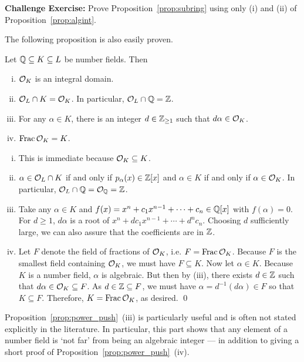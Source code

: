 \noindent \textbf{Challenge Exercise:} Prove Proposition~\ref{prop:subring} using only (i) and (ii) of Proposition~\ref{prop:algint}. \pskip


The following proposition is also easily proven. 


\begin{prop} \label{prop:power_push} 
Let $\mathbb{Q} \subseteq K \subseteq L$ be number fields. Then
\begin{enumerate}[(i)]
\item $\mathcal{O}_K$ is an integral domain.
\item $\mathcal{O}_L \cap K= \mathcal{O}_K$. In particular, $\mathcal{O}_L \cap \mathbb{Q}= \mathbb{Z}$.
\item For any $\alpha \in K$, there is an integer $d \in \mathbb{Z}_{\geq 1}$ such that $d \alpha \in \mathcal{O}_K$.
\item $\operatorname{Frac} \mathcal{O}_K= K$.
\end{enumerate}
\end{prop}

\pf \hfill
\begin{enumerate}[(i)]
\item This is immediate because $\mathcal{O}_K \subseteq K$.

\item $\alpha \in \mathcal{O}_L \cap K$ if and only if $p_\alpha(x) \in \mathbb{Z}[x]$ and $\alpha \in K$ if and only if $\alpha \in \mathcal{O}_K$. In particular, $\mathcal{O}_L \cap \mathbb{Q}= \mathcal{O}_{\mathbb{Q}}= \mathbb{Z}$.

\item Take any $\alpha \in K$ and $f(x)= x^n + c_1 x^{n-1} + \cdots + c_n \in \mathbb{Q}[x]$ with $f(\alpha)= 0$. For $d \geq 1$, $d \alpha$ is a root of $x^n + d c_1 x^{n-1} + \cdots + d^n c_n$. Choosing $d$ sufficiently large, we can also assure that the coefficients are in $\mathbb{Z}$. 

\item Let $F$ denote the field of fractions of $\mathcal{O}_K$, i.e. $F= \operatorname{Frac} \mathcal{O}_K$. Because $F$ is the smallest field containing $\mathcal{O}_K$, we must have $F \subseteq K$. Now let $\alpha \in K$. Because $K$ is a number field, $\alpha$ is algebraic. But then by (iii), there exists $d \in \mathbb{Z}$ such that $d \alpha \in \mathcal{O}_K \subseteq F$. As $d \in \mathbb{Z} \subseteq F$, we must have $\alpha= d^{-1}(d\alpha) \in F$ so that $K \subseteq F$. Therefore, $K= \operatorname{Frac} \mathcal{O}_K$, as desired. \qed \pskip
\end{enumerate}


Proposition~\ref{prop:power_push}~(iii) is particularly useful and is often not stated explicitly in the literature. In particular, this part shows that any element of a number field is `not far' from being an algebraic integer --- in addition to giving a short proof of Proposition~\ref{prop:power_push}~(iv).



